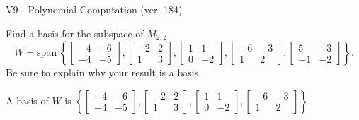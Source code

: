 \begin{exercise}
  \begin{exerciseTitle}V9 - Polynomial Computation (ver. 184)\end{exerciseTitle}
  \begin{exerciseStatement}
    Find a basis for the subspace of \(M_{2,2}\) 
\[W=\mathrm{span}\ \left\{\left[\begin{array}{cc}
-4 & -6 \\
-4 & -5
\end{array}\right] , \left[\begin{array}{cc}
-2 & 2 \\
1 & 3
\end{array}\right] , \left[\begin{array}{cc}
1 & 1 \\
0 & -2
\end{array}\right] , \left[\begin{array}{cc}
-6 & -3 \\
1 & 2
\end{array}\right] , \left[\begin{array}{cc}
5 & -3 \\
-1 & -2
\end{array}\right]\right\}.\]
 Be sure to explain why your result is a basis.


  \end{exerciseStatement}
  \begin{exerciseAnswer}
   A basis of \(W\) is  \(\left\{\left[\begin{array}{cc}
-4 & -6 \\
-4 & -5
\end{array}\right] , \left[\begin{array}{cc}
-2 & 2 \\
1 & 3
\end{array}\right] , \left[\begin{array}{cc}
1 & 1 \\
0 & -2
\end{array}\right] , \left[\begin{array}{cc}
-6 & -3 \\
1 & 2
\end{array}\right]\right\}\).
  


  \end{exerciseAnswer}
\end{exercise}